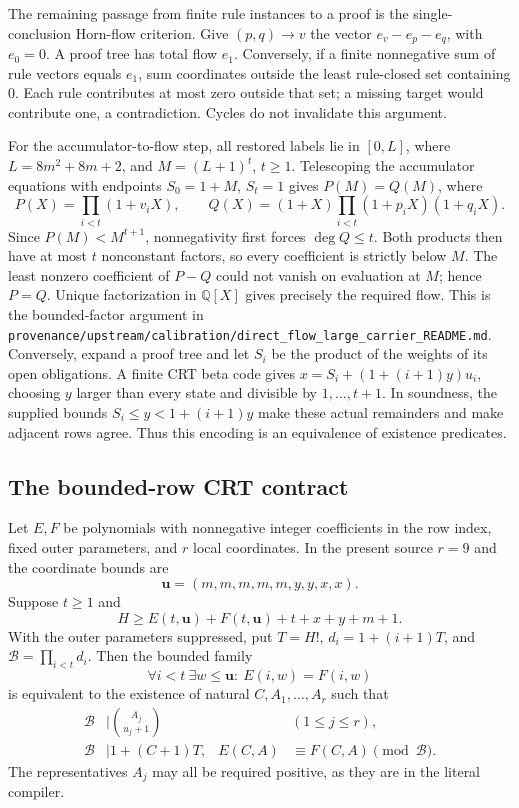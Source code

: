 The remaining passage from finite rule instances to a proof is the
single-conclusion Horn-flow criterion.  Give $(p,q)\to v$ the vector
$e_v-e_p-e_q$, with $e_0=0$.  A proof tree has total flow $e_1$.
Conversely, if a finite nonnegative sum of rule vectors equals $e_1$,
sum coordinates outside the least rule-closed set containing $0$.
Each rule contributes at most zero outside that set; a missing target
would contribute one, a contradiction.  Cycles do not invalidate this
argument.

For the accumulator-to-flow step, all restored labels lie in
$[0,L]$, where $L=8m^2+8m+2$, and $M=(L+1)^t$, $t\ge1$.
Telescoping the accumulator equations with endpoints $S_0=1+M$, $S_t=1$
gives $P(M)=Q(M)$, where
\[
 P(X)=\prod_{i<t}(1+v_iX),\qquad
 Q(X)=(1+X)\prod_{i<t}(1+p_iX)(1+q_iX).
\]
Since $P(M)<M^{t+1}$, nonnegativity first forces $\deg Q\le t$.
Both products then have at most $t$ nonconstant factors, so every
coefficient is strictly below $M$.  The least nonzero coefficient of
$P-Q$ could not vanish on evaluation at $M$; hence $P=Q$.
Unique factorization in $\mathbb Q[X]$ gives precisely the required flow.
This is the bounded-factor argument in
\nolinkurl{provenance/upstream/calibration/direct_flow_large_carrier_README.md}.
Conversely, expand a proof tree and let $S_i$ be the product of the weights
of its open obligations.  A finite CRT beta code gives
$x=S_i+(1+(i+1)y)u_i$, choosing $y$ larger than every state and divisible
by $1,\ldots,t+1$.  In soundness, the supplied bounds
$S_i\le y<1+(i+1)y$ make these actual remainders and make adjacent
rows agree.  Thus this encoding is an equivalence of existence predicates.

\subsection{The bounded-row CRT contract}

Let $E,F$ be polynomials with nonnegative integer coefficients in the row
index, fixed outer parameters, and $r$ local coordinates.  In the present
source $r=9$ and the coordinate bounds are
\[
 \mathbf u=(m,m,m,m,m,y,y,x,x).
\]
Suppose $t\ge1$ and
\[
 H\ge E(t,\mathbf u)+F(t,\mathbf u)+t+x+y+m+1.
\]
With the outer parameters suppressed, put
$T=H!$, $d_i=1+(i+1)T$, and
$\mathcal B=\prod_{i<t}d_i$.  Then the bounded family
\[
 \forall i<t\ \exists w\le\mathbf u:\ E(i,w)=F(i,w)
\]
is equivalent to the existence of natural $C,A_1,\ldots,A_r$ such that
\begin{align*}
 \mathcal B&\mid\binom{A_j}{u_j+1} &&(1\le j\le r),\\
 \mathcal B&\mid 1+(C+1)T, &
 E(C,A)&\equiv F(C,A)\pmod{\mathcal B}.
\end{align*}
The representatives $A_j$ may all be required positive, as they are in the
literal compiler.

